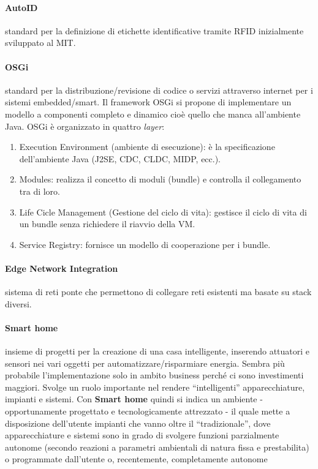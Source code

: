 \paragraph*{AutoID} standard per la definizione di etichette identificative
tramite RFID inizialmente sviluppato al MIT.

\paragraph*{OSGi} standard per la distribuzione/revisione di codice o
servizi attraverso internet per i sistemi embedded/smart. Il framework OSGi si 
propone di implementare un modello a componenti completo e dinamico cioè quello 
che manca all'ambiente Java. OSGi è organizzato in quattro \textit{layer}:
\begin{enumerate}
 \item Execution Environment (ambiente di esecuzione): è la specificazione 
dell'ambiente Java (J2SE, CDC, CLDC, MIDP, ecc.).
 \item Modules: realizza il concetto di moduli (bundle) e controlla il 
collegamento tra di loro.
 \item Life Cicle Management (Gestione del ciclo di vita): gestisce il ciclo di 
vita di un bundle senza richiedere il riavvio della VM.
 \item Service Registry: fornisce un modello di cooperazione per i bundle.
\end{enumerate}

\paragraph*{Edge Network Integration} sistema di reti ponte che
permettono di collegare reti esistenti ma basate su stack diversi.

\paragraph*{Smart home} insieme di progetti per la creazione di una casa
intelligente, inserendo attuatori e sensori nei vari oggetti per
automatizzare/risparmiare energia. Sembra più probabile
l'implementazione solo in ambito business perché ci sono investimenti
maggiori. Svolge un ruolo importante nel rendere ``intelligenti'' 
apparecchiature, impianti e sistemi.
Con \textbf{Smart home} quindi si indica un ambiente - opportunamente 
progettato e tecnologicamente attrezzato - il quale mette a disposizione 
dell'utente impianti che vanno oltre il ``tradizionale'', dove apparecchiature e 
sistemi sono in grado di svolgere funzioni parzialmente autonome (secondo 
reazioni a parametri ambientali di natura fissa e prestabilita) o programmate 
dall'utente o, recentemente, completamente autonome

